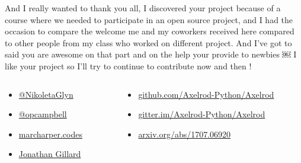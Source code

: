 \documentclass{beamer}
\begin{document}
\begin{frame}
    \begin{footnotesize}
        \begin{tcolorbox}[colback=github,colframe=blue!40!black,title=
                Julie Rymer - \href{https://gitter.im/Axelrod-Python/Axelrod?at=591388592b926f8a6741435d}
                {@Chadys} - (10 May 2017):
    ]
                And I really wanted to thank you all, I discovered your project because of a
                course where we needed to participate in an open source project, and I had the
                occasion to compare the welcome me and my coworkers received here compared to
                other people from my class who worked on different project. And I've got to said
                you are awesome on that part and on the help your provide to newbies ￼ I like
                your project so I'll try to continue to contribute now and then !
       \end{tcolorbox}
    \end{footnotesize}

   \begin{columns}
        \begin{column}{.35\textwidth}
            \begin{itemize}
                \item \href{https://twitter.com/NikoletaGlyn}{@NikoletaGlyn}
                \item \href{https://twitter.com/opcampbell}{@opcampbell}
                \item \href{http://marcharper.codes/}{marcharper.codes}
                \item \href{https://www.cardiff.ac.uk/people/view/98648-gillard-jonathan}{Jonathan Gillard}
            \end{itemize}
        \end{column}
        \begin{column}{.65\textwidth}
            \begin{itemize}
                \item \href{https://github.com/Axelrod-Python/Axelrod}{github.com/Axelrod-Python/Axelrod}
                \item \href{https://gitter.im/Axelrod-Python/Axelrod}{gitter.im/Axelrod-Python/Axelrod}
                \item
                    \href{https://arxiv.org/abs/1707.06920}{arxiv.org/abs/1707.06920}
            \end{itemize}
        \end{column}
   \end{columns}


\end{frame}
\end{document}
